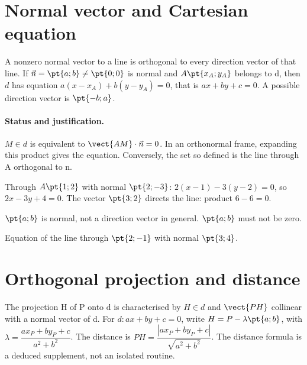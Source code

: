 \section{Normal vector and Cartesian equation}\label{C07-U1}
\begin{keypoint}
A nonzero normal vector to a line is orthogonal to every direction vector of that line. If $\vec n=\pt{a;b}\ne\pt{0;0}$ is normal and $A\pt{x_A;y_A}$ belongs to d, then $d$ has equation $a(x-x_A)+b(y-y_A)=0$, that is $ax+by+c=0$. A possible direction vector is $\pt{-b;a}$.
\end{keypoint}
\paragraph{Status and justification.} $M\in d$ is equivalent to $\vect{AM}\cdot\vec n=0$. In an orthonormal frame, expanding this product gives the equation. Conversely, the set so defined is the line through A orthogonal to n.
\begin{example}Through $A\pt{1;2}$ with normal $\pt{2;-3}$: $2(x-1)-3(y-2)=0$, so $2x-3y+4=0$. The vector $\pt{3;2}$ directs the line: product $6-6=0$.\end{example}\label{C07-EX1}
\begin{pitfall}$\pt{a;b}$ is normal, not a direction vector in general. $\pt{a;b}$ must not be zero.\end{pitfall}
\begin{application}Equation of the line through $\pt{2;-1}$ with normal $\pt{3;4}$.\end{application}\label{C07-AP1}
\section{Orthogonal projection and distance}\label{C07-U2}
\begin{keypoint}
The projection H of P onto d is characterised by $H\in d$ and $\vect{PH}$ collinear with a normal vector of d. For $d:ax+by+c=0$, write $H=P-\lambda\pt{a;b}$, with $\lambda =\dfrac{ax_P+by_P+c}{a^2+b^2}$. The distance is $PH=\dfrac{|ax_P+by_P+c|}{\sqrt {a^2+b^2}}$. The distance formula is a deduced supplement, not an isolated routine.
\end{keypoint}
